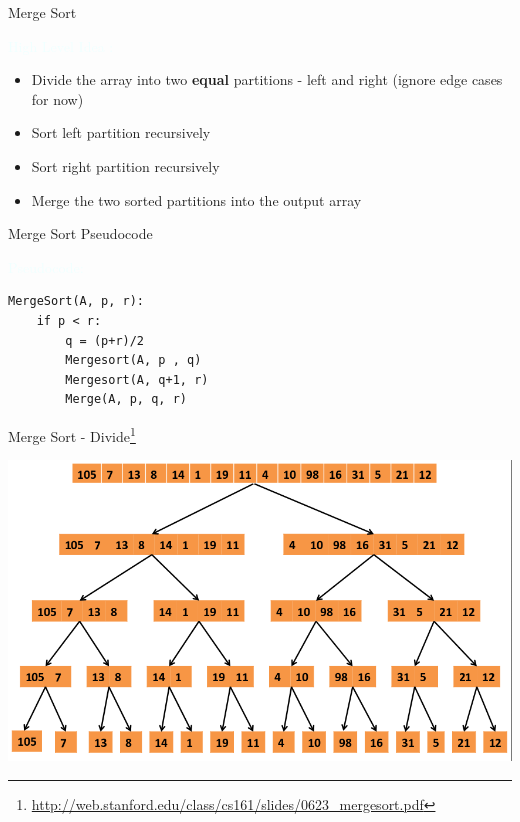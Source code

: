 \documentclass{beamer}
\newcommand{\tblue}[1]{{\Large {\textcolor{azure}{#1}}}}
\begin{document}
\begin{frame}{Merge Sort}

\tblue{High Level Idea :}
\begin{itemize}
\item Divide the array into two {\bf equal} partitions - left and right (ignore edge cases for now)
\item Sort left partition recursively
\item Sort right partition recursively
\item Merge the two sorted partitions into the output array
\end{itemize}
\end{frame}


\begin{frame}[fragile]{Merge Sort Pseudocode}

\tblue{Pseudocode:}
\begin{verbatim}
MergeSort(A, p, r):
    if p < r:
        q = (p+r)/2
        Mergesort(A, p , q)
        Mergesort(A, q+1, r)
        Merge(A, p, q, r)
\end{verbatim}
\end{frame}


\begin{frame}{Merge Sort - Divide\footnote{\url{http://web.stanford.edu/class/cs161/slides/0623_mergesort.pdf}}}
\begin{center}
    \includegraphics[scale=0.38]{mergeSortRecursion.png}
\end{center}
\end{frame}
\end{document}
